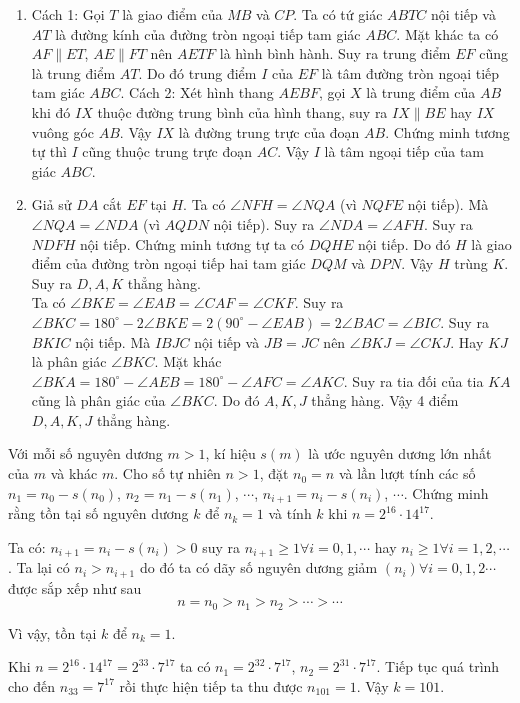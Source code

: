\begin{ex}
{\begin{enumerate}
        Ta có: $AE\cdot AC = AF\cdot AB$ mà $AC = AQ$, $AB = AN$ suy ra $AE\cdot AQ =AN\cdot AF$. Do đó, tứ giác $QNEF$ nội tiếp.
        \item  Cách 1: Gọi $T$ là giao điểm của $MB$ và $CP$. Ta có tứ giác $ABTC$ nội tiếp và $AT$ là đường kính của đường tròn ngoại tiếp tam giác $ABC$. Mặt khác ta
        có $AF\parallel ET$, $AE\parallel FT$ nên $AETF$ là hình bình hành. Suy ra trung điểm $EF$ cũng là trung điểm $AT$. Do đó trung điểm $I$ của $EF$ là tâm đường tròn
        ngoại tiếp tam giác $ABC.$
        Cách 2: Xét hình thang $AEBF$, gọi $X$ là trung điểm của $AB$ khi đó $IX$
        thuộc đường trung bình của hình thang, suy ra $IX\parallel BE$ hay $IX$ vuông góc
        $AB$. Vậy $IX$ là đường trung trực của đoạn $AB$. Chứng minh tương tự thì $I$ cũng
        thuộc trung trực đoạn $AC$. Vậy $I$ là tâm ngoại tiếp của tam giác $ABC$.
        
        \item Giả sử $DA$ cắt $EF$ tại $H$. Ta có $\angle NFH = \angle NQA$ (vì $NQFE$ nội tiếp). Mà $\angle NQA = \angle NDA$ (vì $AQDN$ nội tiếp). Suy ra $\angle NDA = \angle AFH$. Suy ra $NDFH$ nội tiếp. Chứng minh tương tự ta có $DQHE$ nội tiếp. Do đó $H$ là giao điểm của đường tròn ngoại tiếp hai tam giác $DQM$ và $DPN$. Vậy $H$ trùng $K$. Suy ra $D, A, K$ thẳng hàng.\\
        Ta có $\angle BKE =\angle EAB =\angle CAF =\angle CKF$. Suy ra $\angle BKC = 180^\circ-2\angle BKE = 2(90^\circ-\angle EAB) = 2\angle BAC = \angle BIC$. Suy ra $BKIC$ nội tiếp. Mà $IBJC$ nội tiếp và $JB = JC$ nên $\angle BKJ =\angle CKJ$. Hay $KJ$ là phân giác $\angle BKC$.
        Mặt khác $\angle BKA = 180^\circ-\angle AEB = 180^\circ- \angle AFC = \angle AKC$. Suy ra tia đối của tia $KA$ cũng là phân giác của $\angle BKC$. Do đó $A, K, J$ thẳng hàng. Vậy 4 điểm $D, A, K, J$ thẳng hàng.
    \end{enumerate}
}
\end{ex}

\begin{ex}%
    Với mỗi số nguyên dương $m>1$, kí hiệu $s(m)$ là ước nguyên dương lớn nhất của $m$ và khác $m$. Cho số tự nhiên $n>1$, đặt $n_0=n$ và lần lượt tính các số $n_1=n_0-s(n_0)$, $n_2=n_1-s(n_1)$, $\cdots$, $n_{i+1}=n_{i}-s(n_i)$, $\cdots$. Chứng minh rằng tồn tại số nguyên dương $k$ để $n_k=1$ và tính $k$ khi $n=2^{16}\cdot 14^{17}.$ 
\loigiai
    {Ta có: $n_{i+1}=n_i-s(n_i)>0$ suy ra $n_{i+1}\geq 1\forall i=0,1,\cdots$ hay $n_i\geq 1\forall i=1,2,\cdots$. Ta lại có $n_i>n_{i+1}$ do đó ta có dãy số nguyên dương giảm $(n_i)\forall i=0,1,2\cdots$ được sắp xếp như sau $$n=n_0>n_1>n_2>\cdots>\cdots$$
    	
    	Vì vậy, tồn tại $k$ để $n_k=1$.
    	
    	Khi $n=2^{16}\cdot 14^{17}=2^{33}\cdot 7^{17}$ ta có $n_1=2^{32}\cdot 7^{17}$, $n_2=2^{31}\cdot 7^{17}$. Tiếp tục quá trình cho đến $n_{33}=7^{17}$ rồi thực hiện tiếp ta thu được $n_{101}=1$. Vậy $k=101$.
}
\end{ex}

